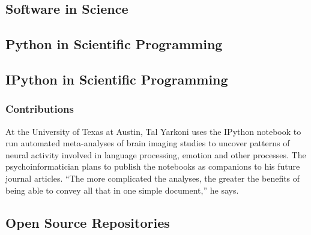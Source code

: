 \subsection{Software in Science}

\subsection{Python in Scientific Programming}




\subsection{IPython in Scientific Programming}



\subsubsection{Contributions}


At the University of Texas at Austin, Tal Yarkoni
uses the IPython notebook to run automated
meta-analyses of brain imaging studies to
uncover patterns of neural activity involved in
language processing, emotion and other processes.
The psychoinformatician plans to publish
the notebooks as companions to his future
journal articles. “The more complicated the
analyses, the greater the benefits of being able to convey all that in one simple document,” he says.
\cite{shen2014interactive}

\subsection{Open Source Repositories}
